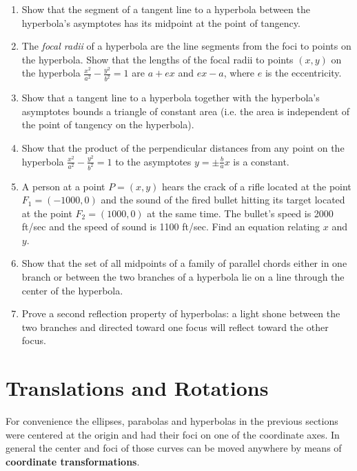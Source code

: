{\begin{enumerate}[\bfseries 1.]
  directrices has the same length as the line segment between the vertexes.
 \item Show that the segment of a tangent line to a hyperbola between the
  hyperbola's asymptotes has its midpoint at the point of tangency.
 \item The \emph{focal radii}
  of a hyperbola are the line segments from the foci to points on the hyperbola.
  Show that the lengths of the focal radii to points $(x,y)$ on the hyperbola
  $\frac{x^2}{a^2} - \frac{y^2}{b^2}=1$ are $a+ex$ and $ex-a$, where $e$ is the
  eccentricity.
 \item Show that a tangent line to a hyperbola together with the hyperbola's
  asymptotes bounds a triangle of constant area (i.e. the area is independent of
  the point of tangency on the hyperbola).
 \item Show that the product of the perpendicular distances from any point on
  the hyperbola $\frac{x^2}{a^2} - \frac{y^2}{b^2}=1$ to the asymptotes
  $y = \pm\frac{b}{a}x$ is a constant.
 \item A person at a point $P=(x,y)$ hears the crack of a rifle located at the
  point $F_1=(-1000,0)$ and the sound of the fired bullet hitting its target
  located at the point $F_2=(1000,0)$ at the same time. The bullet's speed is
  2000 ft/sec and the speed of sound is 1100 ft/sec. Find an equation relating
  $x$ and $y$.
 \item Show that the set of all midpoints of a family of parallel chords either
  in one branch or between the two branches of a hyperbola lie on a line through
  the center of the hyperbola.
 \item Prove a second reflection property of hyperbolas: a light shone between
  the two branches and directed toward one focus will reflect toward the other
  focus.
\end{enumerate}
}
\newpage
\section{Translations and Rotations}
For convenience the ellipses, parabolas and hyperbolas in the previous sections
were centered at the origin and had their foci on one of the coordinate axes.
In general the center and foci of those curves can be moved anywhere by means of
\textbf{coordinate transformations}.

